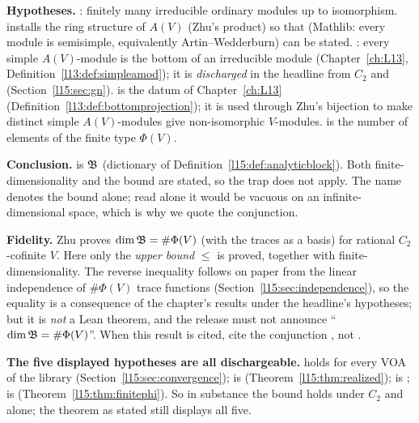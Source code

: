 \begin{dictionary}
\textbf{Hypotheses.} \lean{[Finite (Φ W)]}: finitely many irreducible ordinary modules up to isomorphism.
 installs the ring structure of $A(V)$ (Zhu's product) so that 
(Mathlib: every module is semisimple, equivalently Artin--Wedderburn) can be stated. :
every simple $A(V)$-module is the bottom of an irreducible module (Chapter~\ref{ch:L13},
Definition~\ref{l13:def:simpleamod}); it is \emph{discharged} in the headline from $C_2$ and 
(Section~\ref{l15:sec:gn}).  is the datum of Chapter~\ref{ch:L13} (Definition~\ref{l13:def:bottomprojection}); it is
used through Zhu's bijection  to make distinct simple $A(V)$-modules give non-isomorphic $V$-modules.
 is the number of elements of the finite type $\Phi(V)$.

\textbf{Conclusion.}  is $\mathfrak{B}$ (dictionary of
Definition~\ref{l15:def:analyticblock}). Both finite-dimensionality and the bound are stated, so the 
trap does not apply. The name \allowbreak{}\allowbreak{} denotes the bound alone; read alone it would be
vacuous on an infinite-dimensional space, which is why we quote the conjunction.

\textbf{Fidelity.} Zhu proves $\dim\mathfrak{B}=\#\Phi(V)$ (with the traces as a basis) for rational $C_2$-cofinite $V$. Here
only the \emph{upper bound} $\le$ is proved, together with finite-dimensionality. The reverse inequality follows on paper
from the linear independence of $\#\Phi(V)$ trace functions (Section~\ref{l15:sec:independence}), so the equality is a
consequence of the chapter's results under the headline's hypotheses; but it is \emph{not} a Lean theorem, and the
release must not announce ``$\dim\mathfrak{B}=\#\Phi(V)$''. When this result is cited, cite the conjunction
\allowbreak{}\allowbreak{}\allowbreak{}, not
\allowbreak{}\allowbreak{}.

\textbf{The five displayed hypotheses are all dischargeable.}  holds for every VOA of the library
(Section~\ref{l15:sec:convergence});  is 
(Theorem~\ref{l15:thm:realized});  is ; \lean{[Finite (Φ W)]} is
 (Theorem~\ref{l15:thm:finitephi}). So in substance the bound holds under $C_2$ and
 alone; the theorem as stated still displays all five.
\end{dictionary}

